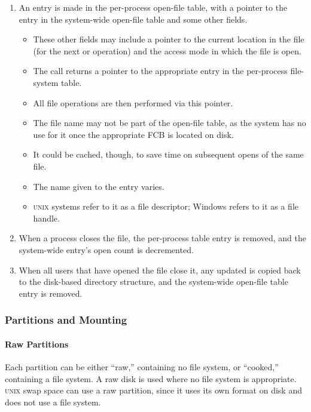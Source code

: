 \begin{enumerate}[noitemsep]
\item An entry is made in the per-process open-file table, with a pointer to the entry in the system-wide open-file table and some other fields.
  \begin{itemize}[noitemsep]
  \item These other fields may include a pointer to the current location in the file (for the next  or  operation) and the access mode in which the file is open.
  \item The  call returns a pointer to the appropriate entry in the per-process file-system table.
  \item All file operations are then performed via this pointer.
  \item The file name may not be part of the open-file table, as the system has no use for it once the appropriate FCB is located on disk.
  \item It could be cached, though, to save time on subsequent opens of the same file.
  \item The name given to the entry varies.
  \item \textsc{unix} systems refer to it as a file descriptor; Windows refers to it as a file handle.
  \end{itemize}

\item When a process closes the file, the per-process table entry is removed, and
  the system-wide entry’s open count is decremented.
\item When all users that have
  opened the file close it, any updated  is copied back to the disk-based
  directory structure, and the system-wide open-file table entry is removed.
\end{enumerate}

\subsubsection{Partitions and Mounting}\label{subsubsec:Partitions_Mounting}
\paragraph{Raw Partitions}\label{par:Raw_Partitions}
Each partition can be either ``raw,'' containing no file system, or ``cooked,'' containing a file system.
A raw disk is used where no file system is appropriate.
\textsc{unix} swap space can use a raw partition, since it uses its own format on disk and does not use a file system.


